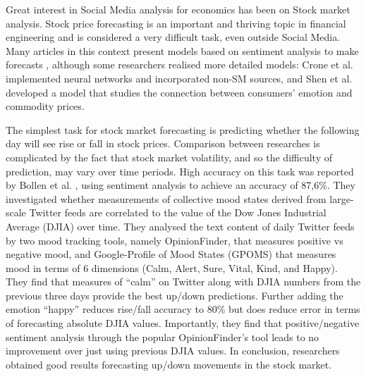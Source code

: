 \documentclass[]{book}
\begin{document}
Great interest in Social Media analysis for economics has been on Stock
market analysis. Stock price forecasting is an important and thriving
topic in financial engineering and is considered a very difficult task,
even outside Social Media. Many articles in this context present models
based on sentiment analysis to make forecasts
\citep[\citet{kordonis2016stock}, \citet{cakra2015stock},
\citet{cakra2015stock}, \citet{wang2016using}, \citet{shen2016using},
\citet{brown2012will}, \citet{rao2012analyzing}]{xu2014collective},
although some researchers realised more detailed models: Crone et al.
\citep{crone2014predicting} implemented neural networks and incorporated
non-SM sources, and Shen et al. \citep{shen2016using} developed a model
that studies the connection between consumers' emotion and commodity
prices.

The simplest task for stock market forecasting is predicting whether the
following day will see rise or fall in stock prices. Comparison between
researches is complicated by the fact that stock market volatility, and
so the difficulty of prediction, may vary over time periods. High
accuracy on this task was reported by Bollen et al.
\citep{bollen2011twitter}, using sentiment analysis to achieve an
accuracy of 87,6\%. They investigated whether measurements of collective
mood states derived from large-scale Twitter feeds are correlated to the
value of the Dow Jones Industrial Average (DJIA) over time. They
analysed the text content of daily Twitter feeds by two mood tracking
tools, namely OpinionFinder, that measures positive vs negative mood,
and Google-Profile of Mood States (GPOMS) that measures mood in terms of
6 dimensions (Calm, Alert, Sure, Vital, Kind, and Happy). They find that
measures of ``calm'' on Twitter along with DJIA numbers from the
previous three days provide the best up/down predictions. Further adding
the emotion ``happy'' reduces rise/fall accuracy to 80\% but does reduce
error in terms of forecasting absolute DJIA values. Importantly, they
find that positive/negative sentiment analysis through the popular
OpinionFinder's tool leads to no improvement over just using previous
DJIA values. In conclusion, researchers obtained good results
forecasting up/down movements in the stock market.
\end{document}
